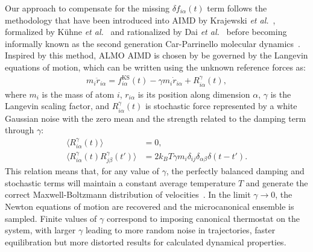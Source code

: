 \documentclass[aps,prl,reprint,amsmath,amssymb]{revtex4-1}
\begin{document}
Our approach to compensate for the missing $\delta f_{i\alpha}(t)$ term follows the methodology that have been introduced into AIMD by Krajewski \emph{et al.}~\cite{PRB-73-041105R}, formalized by K\"uhne \emph{et al.}~\cite{a:2ndcpmd} and rationalized by Dai \emph{et al.}~\cite{a:langevin-why} before becoming informally known as the second generation Car-Parrinello molecular dynamics~\cite{doi:10.1002/wcms.1176}. 
Inspired by this method, ALMO AIMD is chosen by be governed by the Langevin equations of motion, which can be written using the unknown reference forces as:
%
\begin{align}
\label{eq:langevin}
m_i \ddot{r}_{i\alpha} = f^{\text{KS}}_{i\alpha}(t) - \gamma m_i \dot{r}_{i\alpha} + R^{\gamma}_{i\alpha} (t),
\end{align}
%
where $m_i$ is the mass of atom $i$, $r_{i\alpha}$ is its position along dimension $\alpha$, $\gamma$ is the Langevin scaling factor, and $R^{\gamma}_{i\alpha} (t)$ is stochastic force represented by a white Gaussian noise with the zero mean and the strength related to the damping term through $\gamma$:
%
\begin{align}
\label{eq:stochastic}
\langle R^{\gamma}_{i\alpha} (t) \rangle &= 0, \\
\langle R^{\gamma}_{i\alpha} (t)  R^{\gamma}_{j\beta} (t') \rangle &= 2 k_B T \gamma m_i \delta_{ij} \delta_{\alpha\beta} \delta(t-t').
\end{align}
%
This relation means that, for any value of $\gamma$, the perfectly balanced damping and stochastic terms will maintain a constant average temperature $T$ and generate the correct Maxwell-Boltzmann distribution of velocities~\cite{a:Kubo-1986,b:tuckerman-stat}. 
In the limit $\gamma \rightarrow 0$, the Newton equations of motion are recovered and the microcanonical ensemble is sampled. 
Finite values of $\gamma$ correspond to imposing canonical thermostat on the system, with larger $\gamma$ leading to more random noise in trajectories, faster equilibration but more distorted results for calculated dynamical properties. 


\end{document}
